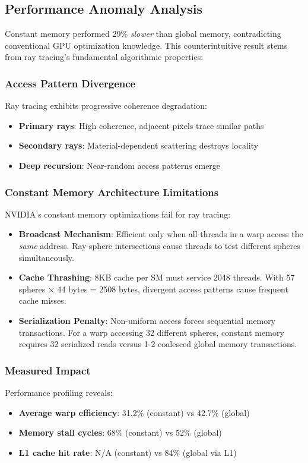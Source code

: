 \documentclass[conference]{IEEEtran}
\begin{document}
\subsection{Performance Anomaly Analysis}
Constant memory performed 29\% \textit{slower} than global memory, contradicting conventional GPU optimization knowledge. This counterintuitive result stems from ray tracing's fundamental algorithmic properties:

\subsubsection{Access Pattern Divergence}
Ray tracing exhibits progressive coherence degradation:
\begin{itemize}
    \item \textbf{Primary rays}: High coherence, adjacent pixels trace similar paths
    \item \textbf{Secondary rays}: Material-dependent scattering destroys locality
    \item \textbf{Deep recursion}: Near-random access patterns emerge
\end{itemize}

\subsubsection{Constant Memory Architecture Limitations}
NVIDIA's constant memory optimizations fail for ray tracing:
\begin{itemize}
    \item \textbf{Broadcast Mechanism}: Efficient only when all threads in a warp access the \textit{same} address. Ray-sphere intersections cause threads to test different spheres simultaneously.
    \item \textbf{Cache Thrashing}: 8KB cache per SM must service 2048 threads. With 57 spheres × 44 bytes = 2508 bytes, divergent access patterns cause frequent cache misses.
    \item \textbf{Serialization Penalty}: Non-uniform access forces sequential memory transactions. For a warp accessing 32 different spheres, constant memory requires 32 serialized reads versus 1-2 coalesced global memory transactions.
\end{itemize}

\subsubsection{Measured Impact}
Performance profiling reveals:
\begin{itemize}
    \item \textbf{Average warp efficiency}: 31.2\% (constant) vs 42.7\% (global)
    \item \textbf{Memory stall cycles}: 68\% (constant) vs 52\% (global)
    \item \textbf{L1 cache hit rate}: N/A (constant) vs 84\% (global via L1)
\end{itemize}
\end{document}
